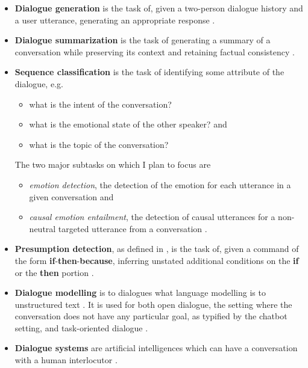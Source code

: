\documentclass[12pt]{report}
\begin{document}
\begin{itemize}[nolistsep]
    \item
        \textbf{Dialogue generation} is the task of, given a two-person dialogue history and a user utterance, generating an appropriate response \cite{Li2016-ef}.
    \item
        \textbf{Dialogue summarization} is the task of generating a summary of a conversation while preserving its context \cite{Kim2022-pz} and retaining factual consistency \cite{Richardson2023-mq}.
    \item
        \textbf{Sequence classification} is the task of identifying some attribute of the dialogue, e.g.
        \begin{itemize}[nolistsep]
            \item what is the intent of the conversation?
            \item what is the emotional state of the other speaker? and
            \item what is the topic of the conversation?
        \end{itemize}
        The two major subtasks on which I plan to focus are
        \begin{itemize}[nolistsep]
            \item \textit{emotion detection}, the detection of the emotion for each utterance in a given conversation \cite{Yi2022-tv} and
            \item \textit{causal emotion entailment}, the detection of causal utterances for a non-neutral targeted utterance from a conversation \cite{Richardson2023-mq,Li2022-jr}.
        \end{itemize}
    \item
        \textbf{Presumption detection}, as defined in \cite{Arabshahi2021-oz}, is the task of, given a command of the form \textbf{if}-\textbf{then}-\textbf{because}, inferring unstated additional conditions on the \textbf{if} or the \textbf{then} portion \cite{Arabshahi2021-oz}.
    \item
        \textbf{Dialogue modelling} is to dialogues what language modelling is to unstructured text \cite{Richardson2023-mq}.
        It is used for both open dialogue, the setting where the conversation does not have any particular goal, as typified by the chatbot setting, and task-oriented dialogue \cite{Richardson2023-mq}.
    \item
        \textbf{Dialogue systems} are artificial intelligences which can have a conversation with a human interlocutor \cite{Ni2023-jk}.

\end{itemize}
\end{document}
